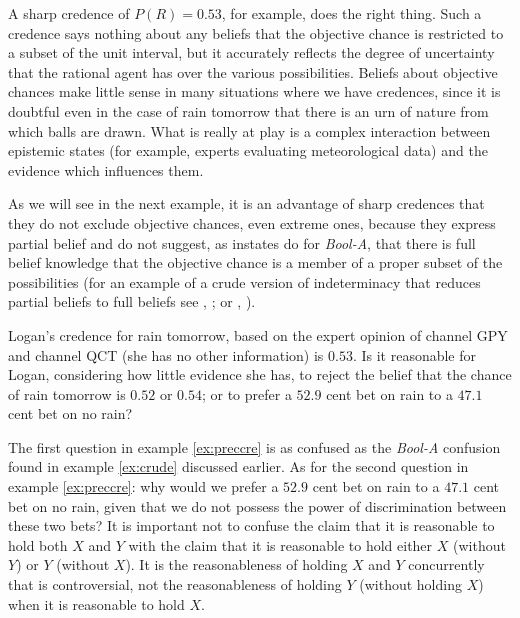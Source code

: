 \documentclass[11pt]{article}
\newcommand{\anderson}[0]{\textit{Bool-A}}
\begin{document}
A sharp credence of $P(R)=0.53$, for example, does the right thing.
Such a credence says nothing about any beliefs that the objective
chance is restricted to a subset of the unit interval, but it
accurately reflects the degree of uncertainty that the rational agent
has over the various possibilities. Beliefs about objective chances
make little sense in many situations where we have credences, since it
is doubtful even in the case of rain tomorrow that there is an urn of
nature from which balls are drawn. What is really at play is a complex
interaction between epistemic states (for example, experts evaluating
meteorological data) and the evidence which influences them.

As we will see in the next example, it is an advantage of sharp
credences that they do not exclude objective chances, even extreme
ones, because they express partial belief and do not suggest, as
instates do for {\anderson}, that there is full belief knowledge
that the objective chance is a member of a proper subset of the
possibilities (for an example of a crude version of indeterminacy that
reduces partial beliefs to full beliefs see ,
; or ,
).

\begin{quotex}
  \label{ex:preccre} Logan's credence for
  rain tomorrow, based on the expert opinion of channel GPY and
  channel QCT (she has no other information) is $0.53$. Is it
  reasonable for Logan, considering how little evidence she has, to
  reject the belief that the chance of rain tomorrow is $0.52$ or
  $0.54$; or to prefer a $52.9$ cent bet on rain to a $47.1$ cent bet
  on no rain?
\end{quotex}

The first question in example \ref{ex:preccre} is as confused as the
{\anderson} confusion found in example \ref{ex:crude} discussed
earlier. As for the second question in example \ref{ex:preccre}: why
would we prefer a $52.9$ cent bet on rain to a $47.1$ cent bet on no
rain, given that we do not possess the power of discrimination between
these two bets? It is important not to confuse the claim that it is
reasonable to hold both $X$ and $Y$ with the claim that it is
reasonable to hold either $X$ (without $Y$) or $Y$ (without $X$). It
is the reasonableness of holding $X$ and $Y$ concurrently that is
controversial, not the reasonableness of holding $Y$ (without holding
$X$) when it is reasonable to hold $X$.
\end{document}
